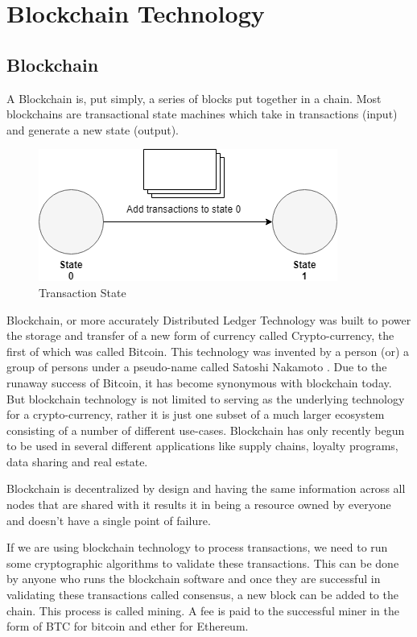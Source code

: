 \documentclass[11pt,openright]{report}
\begin{document}
\chapter{Blockchain Technology}
\label{chapter:blockchain_tech}
\section{Blockchain}
A Blockchain is, put simply, a series of blocks put together in a chain. Most blockchains are transactional state machines which take in transactions (input) and generate a new state (output).
\begin{figure}
	\centering
	\includegraphics[scale=0.5]{images/statemachine.png}
	\caption{Transaction State}
	\label{fig:State Change}
\end{figure}

Blockchain, or more accurately Distributed Ledger Technology was built to power the storage and transfer of a new form of currency called Crypto-currency, the first of which was called Bitcoin. This technology was invented by a person (or) a group of persons under a pseudo-name called Satoshi Nakamoto \cite{nakamoto2012bitcoin}. Due to the runaway success of Bitcoin, it has become synonymous with blockchain today. But blockchain technology is not limited to serving as the underlying technology for a crypto-currency, rather it is just one subset of a much larger ecosystem consisting of a number of different use-cases. Blockchain has only recently begun to be used in several different applications like supply chains, loyalty programs, data sharing and real estate.

Blockchain is decentralized by design\cite{gencer2018decentralization} and having the same information across all nodes that are shared with it results it in being a resource owned by everyone and doesn’t have a single point of failure. 

If we are using blockchain technology to process transactions, we need to run some cryptographic algorithms to validate these transactions. This can be done by anyone who runs the blockchain software and once they are successful in validating these transactions called consensus, a new block can be added to the chain. This process is called mining. A fee is paid to the successful miner in the form of BTC for bitcoin and ether for Ethereum.
\end{document}
